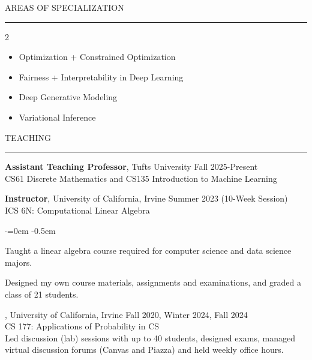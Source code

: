 \documentclass{resume} %
\renewenvironment{rSection}[1]{
\sectionskip
\textcolor{CarnegieMellonRed}{\MakeUppercase{#1}}
\sectionlineskip
\hrule
\begin{list}{}{
\setlength{\leftmargin}{1.5em}
}
\item[]
}{
\end{list}
}
\begin{document}
\begin{rSection}{Areas of Specialization}
\begin{multicols}{2}
\begin{itemize}
    \item Optimization + Constrained Optimization
    \item Fairness + Interpretability in Deep Learning
    \item Deep Generative Modeling
    \item Variational Inference
\end{itemize}
\end{multicols}
\end{rSection}
\begin{rSection}{Teaching}

{\bf Assistant Teaching Professor}, Tufts University \hfill {Fall 2025-Present}\\
CS61 Discrete Mathematics and CS135 Introduction to Machine Learning
  \vspace{1.em}

{\bf Instructor}, University of California, Irvine \hfill { Summer 2023 (10-Week Session)}\\
ICS 6N: Computational Linear Algebra
\begin{list}{$\cdot$}{\leftmargin=0em} 
    \itemsep -0.5em \vspace{-0.5em}
      \item Taught a linear algebra course required for computer science and data science majors.
      \item Designed my own course materials, assignments and examinations, and graded a class of 21 students.
  \end{list}
  \vspace{1.em}

 , University of California, Irvine \hfill { Fall 2020, Winter 2024, Fall 2024}\\
 CS 177: Applications of Probability in CS\\
  Led discussion (lab) sessions with up to 40 students, designed exams, managed virtual discussion forums (Canvas and Piazza) and held weekly office hours.
  \vspace{1.em}


\end{rSection}
\end{document}
